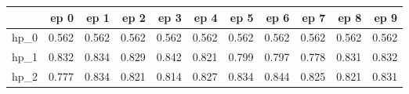 \begin{tabular}{lrrrrrrrrrr}
\toprule
{} &   ep 0 &   ep 1 &   ep 2 &   ep 3 &   ep 4 &   ep 5 &   ep 6 &   ep 7 &   ep 8 &   ep 9 \\
\midrule
hp\_0 &  0.562 &  0.562 &  0.562 &  0.562 &  0.562 &  0.562 &  0.562 &  0.562 &  0.562 &  0.562 \\
hp\_1 &  0.832 &  0.834 &  0.829 &  0.842 &  0.821 &  0.799 &  0.797 &  0.778 &  0.831 &  0.832 \\
hp\_2 &  0.777 &  0.834 &  0.821 &  0.814 &  0.827 &  0.834 &  0.844 &  0.825 &  0.821 &  0.831 \\
\bottomrule
\end{tabular}
